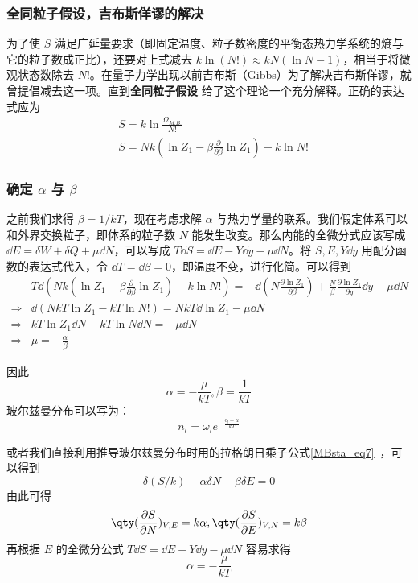 \subsubsection{全同粒子假设，吉布斯佯谬的解决}
为了使 $S$ 满足广延量要求（即固定温度、粒子数密度的平衡态热力学系统的熵与它的粒子数成正比），还要对上式减去 $k\ln (N!)\approx k N(\ln N-1)$，相当于将微观状态数除去 $N!$。在量子力学出现以前吉布斯（Gibbs）为了解决吉布斯佯谬，就曾提倡减去这一项。直到\textbf{全同粒子假设} 给了这个理论一个充分解释。正确的表达式应为
\begin{equation}\label{TheSta_eq5}
\begin{aligned}
&S=k\ln \frac{\Omega_{M.B.}}{N!}\\
&S=Nk(\ln Z_1-\beta\frac{\partial }{\partial \beta}\ln Z_1)-k\ln N!
\end{aligned}
\end{equation}
\subsubsection{确定 $\alpha$ 与 $\beta$}
之前我们求得 $\beta=1/kT$，现在考虑求解 $\alpha$ 与热力学量的联系。我们假定体系可以和外界交换粒子，即体系的粒子数 $N$ 能发生改变。那么内能的全微分式应该写成 $\dd E=\delta W+\delta Q+\mu\dd N$，可以写成 $T\dd S=\dd E-Y\dd y-\mu\dd N$。将 $S,E,Y\dd y$ 用配分函数的表达式代入，令 $\dd T=\dd \beta=0$，即温度不变，进行化简。可以得到
\begin{equation}
\begin{aligned}
&T\dd(Nk(\ln Z_1-\beta\frac{\partial }{\partial \beta}\ln Z_1)-k\ln N!)=-\dd(N \frac{\partial \ln Z_1}{\partial \beta})+\frac{N}{\beta}\frac{\partial \ln Z_1}{\partial y}\dd y-\mu\dd N\\
\Rightarrow &\dd(NkT\ln Z_1-kT\ln N!)=NkT \dd \ln Z_1 -\mu \dd N\\
\Rightarrow & kT\ln Z_1 \dd N-kT\ln N\dd N=-\mu\dd N\\
\Rightarrow &\mu=-\frac{\alpha}{\beta}
\end{aligned}
\end{equation}

因此
\begin{equation}
\alpha=-\frac{\mu}{kT},\beta=\frac{1}{kT}
\end{equation}
玻尔兹曼分布可以写为：
\begin{equation}
n_l=\omega_l e^{-\frac{\epsilon_l-\mu}{kT}}
\end{equation}

或者我们直接利用推导玻尔兹曼分布时用的拉格朗日乘子公式\autoref{MBsta_eq7}~，可以得到
\begin{equation}
\delta(S/k)-\alpha \delta N-\beta \delta E=0
\end{equation}
由此可得
\begin{equation}
\qty(\frac{\partial S}{\partial N})_{V,E}=k\alpha,\qty(\frac{\partial S}{\partial E})_{V,N}=k\beta
\end{equation}
再根据 $E$ 的全微分公式 $T\dd S=\dd E-Y\dd y-\mu\dd N$ 容易求得
\begin{equation}
\alpha=-\frac{\mu}{kT}
\end{equation}

